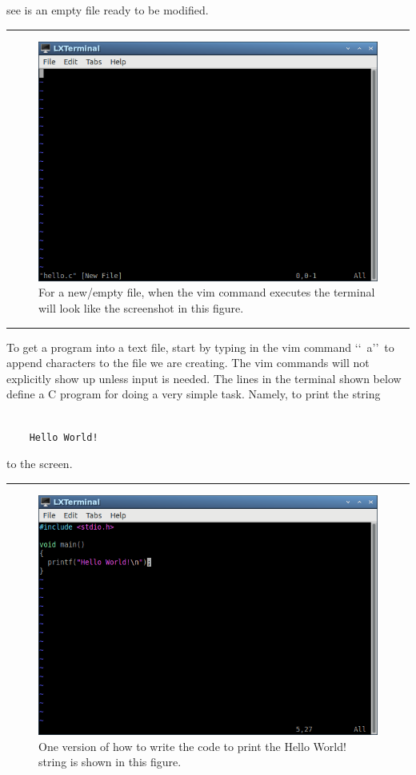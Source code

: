 \documentclass[10pt,fleqn]{article}
\begin{document}
see is an empty file ready to be modified.
\vskip0.1in\hrule\vskip0.1in
\vfill
\begin{figure}[h]
\centering
\includegraphics[width=5.0in]{../images/hello_world_03.png}
\caption{For a new/empty file, when the vim command executes the terminal will
         look like the screenshot in this figure.}
\end{figure}
\eject
\vskip0.1in\hrule\vskip0.1in
\noindent
To get a program into a text file, start by typing in the vim command
\lq\lq\ a\rq\rq\ to append characters to the file we are creating. The vim
commands will not explicitly show up unless input is needed. The lines in the
terminal shown below define a C program for doing a very simple task. Namely, to
print the string
\begin{verbatim}

    Hello World!

\end{verbatim}
to the screen.
\vskip0.1in\hrule\vskip0.1in
\vfill
\begin{figure}[h]
\centering
\includegraphics[width=5.0in]{../images/hello_world_04.png}
\caption{One version of how to write the code to print the Hello World! string
         is shown in this figure.}
\end{figure}
\end{document}
